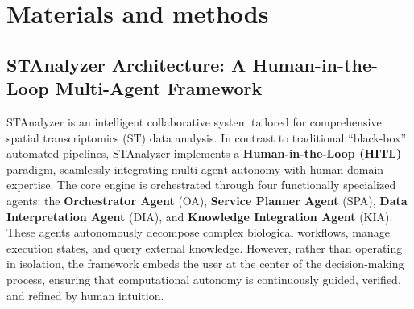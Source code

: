 \documentclass[a4,center,fleqn]{NAR}
\begin{document}
\section{Materials and methods}

\subsection{STAnalyzer Architecture: A Human-in-the-Loop Multi-Agent Framework}
STAnalyzer is an intelligent collaborative system tailored for comprehensive spatial transcriptomics (ST) data analysis. In contrast to traditional ``black-box'' automated pipelines, STAnalyzer implements a \textbf{Human-in-the-Loop (HITL)} paradigm, seamlessly integrating multi-agent autonomy with human domain expertise. The core engine is orchestrated through four functionally specialized agents: the \textbf{Orchestrator Agent} (OA), \textbf{Service Planner Agent} (SPA), \textbf{Data Interpretation Agent} (DIA), and \textbf{Knowledge Integration Agent} (KIA). These agents autonomously decompose complex biological workflows, manage execution states, and query external knowledge. However, rather than operating in isolation, the framework embeds the user at the center of the decision-making process, ensuring that computational autonomy is continuously guided, verified, and refined by human intuition.
\end{document}
